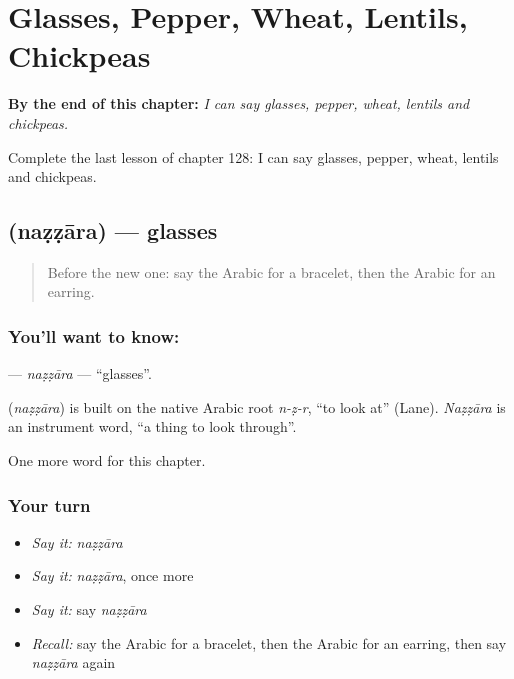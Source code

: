 
\chapter{Glasses, Pepper, Wheat, Lentils, Chickpeas}
\label{ch:ar-glasses-pepper-wheat-lentils-chickpeas}

\begin{chapteropening}
\textbf{By the end of this chapter:} \emph{I can say glasses, pepper, wheat, lentils and chickpeas.}

Complete the last lesson of chapter 128: I can say glasses, pepper, wheat, lentils and chickpeas.
\end{chapteropening}

\section[\texorpdfstring{\ar{نظارة} (naẓẓāra)}{نظارة (naẓẓāra)}]{ (naẓẓāra) — glasses}

\label{lesson:AR-C128-nazzara}



\begin{quote}
Before the new one: say the Arabic for a bracelet, then the Arabic for an earring.
\end{quote}

\subsection*{You'll want to know: }
\textbf{} — \emph{naẓẓāra} — \textquotedblleft{}glasses\textquotedblright{}.

\begin{cousinweb}
\textbf{} (\emph{naẓẓāra}) is built on the native Arabic root \emph{n-ẓ-r}, \textquotedblleft{}to look at\textquotedblright{} (Lane). \emph{Naẓẓāra} is an instrument word, \textquotedblleft{}a thing to look through\textquotedblright{}.
\end{cousinweb}

\begin{grammarlens}[title={What you've built}]
One more word for this chapter.
\end{grammarlens}

\subsection*{Your turn}
\begin{itemize}
\raggedright
  \item \emph{Say it:} \emph{naẓẓāra}
  \item \emph{Say it:} \emph{naẓẓāra}, once more
  \item \emph{Say it:} say \emph{naẓẓāra}
  \item \emph{Recall:} say the Arabic for a bracelet, then the Arabic for an earring, then say \emph{naẓẓāra} again
\end{itemize}

